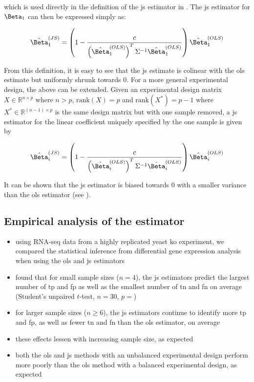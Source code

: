 which is used directly in the definition of the \gls{js} estimator in .
The \gls{js} estimator for $\Beta_1$ can then be expressed simply as:

\begin{equation}
  \hat{\Beta}_1^{(JS)} = \left( 1 - \frac{c}{\left( \hat{\Beta}_1^{(OLS)} \right)^T \Sigma^{-1} \hat{\Beta}_1^{(OLS)}} \right) \hat{\Beta}_1^{(OLS)}
  \label{eqn:js_defn_ols}
\end{equation}

From this definition, it is easy to see that the \gls{js} estimate is colinear with the \gls{ols} estimate but uniformly shrunk towards 0.
For a more general experimental design, the above can be extended.
Given an experimental design matrix $X \in \mathbb{R}^{n \times p}$ where $n > p$, $\text{rank}(X) = p$ and $\text{rank}(X^*) = p - 1$ where $X^* \in \mathbb{R}^{(n - 1) \times p}$ is the same design matrix but with one sample removed, a \gls{js} estimator for the linear coefficient uniquely specified by the one sample is given by

\begin{equation*}
  \hat{\Beta}_i^{(JS)} = \left( 1 - \frac{c}{\left( \hat{\Beta}_i^{(OLS)} \right)^T \Sigma^{-1} \hat{\Beta}_i^{(OLS)}} \right) \hat{\Beta}_i^{(OLS)}
\end{equation*}

It can be shown that the \gls{js} estimator is biased towards 0 with a smaller variance than the \gls{ols} estimator (see ).

\subsection{Empirical analysis of the  estimator}



\begin{itemize}
  \item using RNA-seq data from a highly replicated yeast \gls{ko} experiment, we compared the statistical inference from differential gene expression analysis when using the \gls{ols} and \gls{js} estimators
  \item found that for small sample sizes ($n = 4$), the \gls{js} estimators predict the largest number of \gls{tp} and \gls{fp} as well as the smallest number of \gls{tn} and \gls{fn} on average (Student's unpaired $t$-test, $n = 30$, $p = $)
  \item for larger sample sizes ($n \ge 6$), the \gls{js} estimators continue to identify more \gls{tp} and \gls{fp}, as well as fewer \gls{tn} and \gls{fn} than the \gls{ols} estimator, on average
  \item these effects lessen with increasing sample size, as expected
  \item both the \gls{ols} and \gls{js} methods with an unbalanced experimental design perform more poorly than the \gls{ols} method with a balanced experimental design, as expected
\end{itemize}


